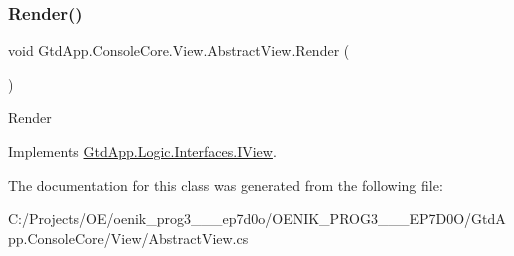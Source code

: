 \mbox{\label{class_gtd_app_1_1_console_core_1_1_view_1_1_abstract_view_a1afdcb17203b5dc23d757c853a3d60bf}} 
\subsubsection{\texorpdfstring{Render()}{Render()}}
{\footnotesize\ttfamily void Gtd\+App.\+Console\+Core.\+View.\+Abstract\+View.\+Render (\begin{DoxyParamCaption}{ }\end{DoxyParamCaption})}



Render 



Implements \mbox{\hyperlink{interface_gtd_app_1_1_logic_1_1_interfaces_1_1_i_view_a38544ad3bed7acb83711278dd38a33e8}{Gtd\+App.\+Logic.\+Interfaces.\+I\+View}}.



The documentation for this class was generated from the following file\+:\begin{DoxyCompactItemize}
\item 
C\+:/\+Projects/\+O\+E/oenik\+\_\+prog3\+\_\+\_\+\_\+ep7d0o/\+O\+E\+N\+I\+K\+\_\+\+P\+R\+O\+G3\+\_\+\_\+\_\+\+E\+P7\+D0\+O/\+Gtd\+App.\+Console\+Core/\+View/Abstract\+View.\+cs\end{DoxyCompactItemize}
